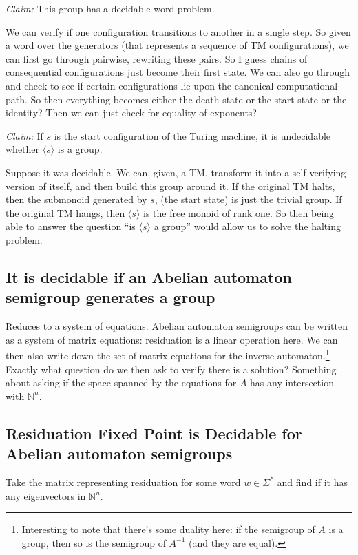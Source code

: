 \documentclass[10pt]{article}
\begin{document}
\textit{Claim:} This group has a decidable word problem.

We can verify if one configuration transitions to another in a single
step. So given a word over the generators (that represents a sequence
of TM configurations), we can first go through pairwise, rewriting
these pairs. So I guess chains of consequential configurations just
become their first state. We can also go through and check to see if
certain configurations lie upon the canonical computational path. So
then everything becomes either the death state or the start state or
the identity? Then we can just check for equality of exponents?

\textit{Claim:} If $s$ is the start configuration of the Turing
machine, it is undecidable whether $\langle s \rangle$ is a group.

Suppose it was decidable. We can, given, a TM, transform it into a
self-verifying version of itself, and then build this group around
it. If the original TM halts, then the submonoid generated by $s$,
(the start state) is just the trivial group. If the original TM hangs,
then $\langle s \rangle$ is the free monoid of rank one. So then being
able to answer the question ``is $\langle s \rangle $ a group'' would
allow us to solve the halting problem.

\subsection{It is decidable if an Abelian automaton semigroup
  generates a group}

Reduces to a system of equations. Abelian automaton semigroups can be
written as a system of matrix equations: residuation is a linear
operation here. We can then also write down the set of matrix
equations for the inverse automaton.\footnote{Interesting to note that
  there's some duality here: if the semigroup of $A$ is a group, then
  so is the semigroup of $A^{-1}$ (and they are equal).}  Exactly what
question do we then ask to verify there is a solution? Something about
asking if the space spanned by the equations for $A$ has any
intersection with $\mathbb{N}^n$.

\subsection{Residuation Fixed Point is Decidable for Abelian automaton
  semigroups}

Take the matrix representing residuation for some word
$w \in \Sigma^*$ and find if it has any eigenvectors in
$\mathbb{N}^n$.
\end{document}
